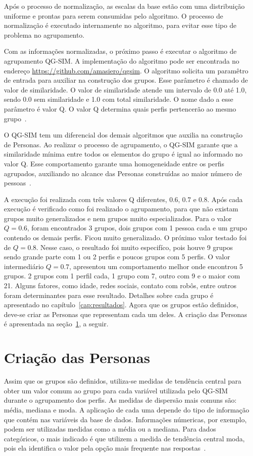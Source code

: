 Após o processo de normalização, as escalas da base estão com uma distribuição uniforme e prontas para serem consumidas pelo algoritmo. O processo de normalização é executado internamente no algoritmo, para evitar esse tipo de problema no agrupamento.

Com as informações normalizadas, o próximo passo é executar o algoritmo de agrupamento QG-SIM. A implementação do algoritmo pode ser encontrada no endereço \url{https://github.com/amasiero/qgsim}. O algoritmo solicita um paramêtro de entrada para auxiliar na construção dos grupos. Esse parâmetro é chamado de valor de similaridade. O valor de similaridade atende um intervalo de 0.0 até 1.0, sendo 0.0 sem similaridade e 1.0 com total similaridade. O nome dado a esse parâmetro é valor Q. O valor Q determina quais perfis pertencerão ao mesmo grupo~\cite{masiero:2013}.

O QG-SIM tem um diferencial dos demais algoritmos que auxilia na construção de Personas. Ao realizar o processo de agrupamento, o QG-SIM garante que a similaridade mínima entre todos os elementos do grupo é igual ao informado no valor Q. Esse comportamento garante uma homogeneidade entre os perfis agrupados, auxiliando no alcance das Personas construídas ao maior número de pessoas~\cite{masiero:2013}.

A execução foi realizada com três valores Q diferentes, 0.6, 0.7 e 0.8. Após cada execução é verificado como foi realizado o agrupamento, para que não existam grupos muito generalizados e nem grupos muito especializados. Para o valor $Q = 0.6$, foram encontrados 3 grupos, dois grupos com 1 pessoa cada e um grupo contendo os demais perfis. Ficou muito generalizado. O próximo valor testado foi de $Q = 0.8$. Nesse caso, o resultado foi muito especifíco, pois houve 9 grupos sendo grande parte com 1 ou 2 perfis e poucos grupos com 5 perfis. O valor intermediário $Q = 0.7$, apresentou um comportamento melhor onde encontrou 5 grupos. 2 grupos com 1 perfil cada, 1 grupo com 7, outro com 9 e o maior com 21. Alguns fatores, como idade, redes sociais, contato com robôs, entre outros foram determinantes para esse resultado. Detalhes sobre cada grupo é apresentado no capítulo~\ref{cap:resultados}. Agora que os grupos estão definidos, deve-se criar as Personas que representam cada um deles. A criação das Personas é apresentada na seção~\ref{sec:criacaopersonas}, a seguir.

\section{Criação das Personas}
\label{sec:criacaopersonas}
Assim que os grupos são definidos, utiliza-se medidas de tendência central para obter um valor comum ao grupo para cada variável utilizada pelo QG-SIM durante o agrupamento dos perfis. As medidas de dispersão mais comuns são: média, mediana e moda. A aplicação de cada uma depende do tipo de informação que contém nas variáveis da base de dados. Informações númericas, por exemplo, podem ser utilizadas medidas como a média ou a mediana. Para dados categóricos, o mais indicado é que utilizem a medida de tendência central moda, pois ela identifica o valor pela opção mais frequente nas respostas~\cite{masiero:2013}.

